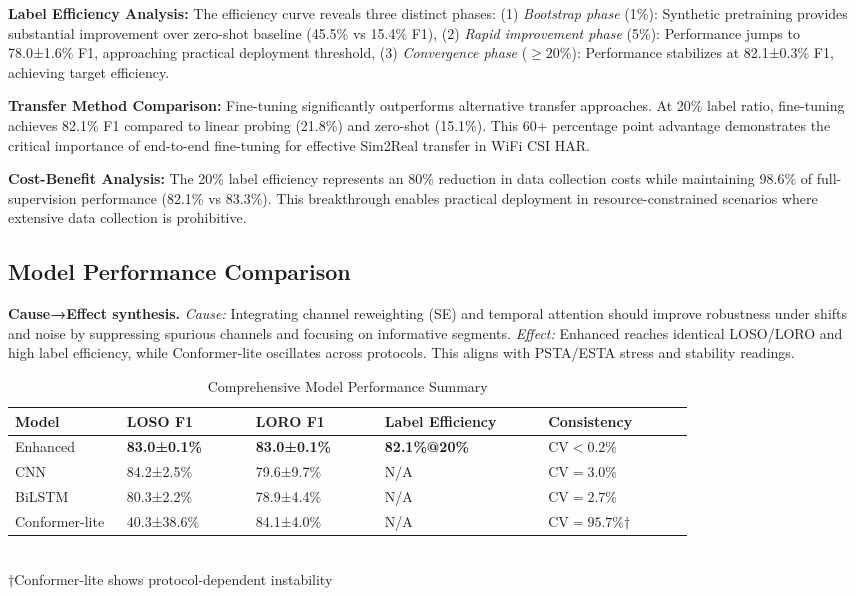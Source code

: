\documentclass[journal]{IEEEtran}
\begin{document}
\textbf{Label Efficiency Analysis:} The efficiency curve reveals three distinct phases: (1) \textit{Bootstrap phase} (1\%): Synthetic pretraining provides substantial improvement over zero-shot baseline (45.5\% vs 15.4\% F1), (2) \textit{Rapid improvement phase} (5\%): Performance jumps to 78.0±1.6\% F1, approaching practical deployment threshold, (3) \textit{Convergence phase} ($\geq 20\%$): Performance stabilizes at 82.1±0.3\% F1, achieving target efficiency.

\textbf{Transfer Method Comparison:} Fine-tuning significantly outperforms alternative transfer approaches. At 20\% label ratio, fine-tuning achieves 82.1\% F1 compared to linear probing (21.8\%) and zero-shot (15.1\%). This 60+ percentage point advantage demonstrates the critical importance of end-to-end fine-tuning for effective Sim2Real transfer in WiFi CSI HAR.

\textbf{Cost-Benefit Analysis:} The 20\% label efficiency represents an 80\% reduction in data collection costs while maintaining 98.6\% of full-supervision performance (82.1\% vs 83.3\%). This breakthrough enables practical deployment in resource-constrained scenarios where extensive data collection is prohibitive.

\subsection{Model Performance Comparison}

\textbf{Cause→Effect synthesis.} \emph{Cause:} Integrating channel reweighting (SE) and temporal attention should improve robustness under shifts and noise by suppressing spurious channels and focusing on informative segments. \emph{Effect:} Enhanced reaches identical LOSO/LORO and high label efficiency, while Conformer-lite oscillates across protocols. This aligns with PSTA/ESTA stress and stability readings.


\begin{table}[ht]
\centering
\caption{Comprehensive Model Performance Summary}
\begin{tabular}{p{0.13\linewidth} p{0.15\linewidth} p{0.15\linewidth} p{0.19\linewidth} p{0.17\linewidth}}
\toprule
Model & LOSO F1 & LORO F1 & Label Efficiency & Consistency \\
\midrule
Enhanced & \textbf{83.0±0.1\%} & \textbf{83.0±0.1\%} & \textbf{82.1\%@20\%} & \textbf{$\text{CV}<0.2\%$} \\
CNN & 84.2±2.5\% & 79.6±9.7\% & N/A & $\text{CV}=3.0\%$ \\
BiLSTM & 80.3±2.2\% & 78.9±4.4\% & N/A & $\text{CV}=2.7\%$ \\
Conformer-lite & 40.3±38.6\% & 84.1±4.0\% & N/A & $\text{CV}=95.7\%$† \\
\bottomrule
\end{tabular}\\
\footnotesize{†Conformer-lite shows protocol-dependent instability}
\label{tab:model_performance}
\end{table}
\end{document}
